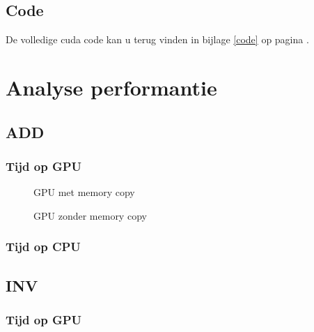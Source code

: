\documentclass[twoside,a4paper]{article}
\begin{document}
\subsection{Code}
De volledige cuda code kan u terug vinden in bijlage \ref{code} op pagina \pageref{code}.

\section{Analyse performantie}

\subsection{ADD}
\subsubsection{Tijd op GPU}

\begin{figure}[H]
    \centering
    
    \caption{GPU met memory copy}
    \label{}
\end{figure}

\begin{figure}[H]
    \centering
    
    \caption{GPU zonder memory copy}
    \label{}
\end{figure}

\subsubsection{Tijd op CPU}

\subsection{INV}
\subsubsection{Tijd op GPU}
\end{document}
